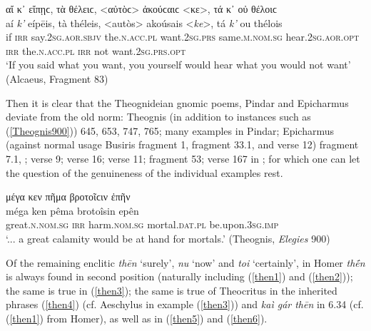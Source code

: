 \begin{exe}
\ex αἴ κ᾽ εἴπῃϲ, τὰ θέλειϲ, \textless{}αὐτὸϲ\textgreater{} ἀκούϲαιϲ \textless{}κε\textgreater{}, τά κ᾽ οὐ θέλοιϲ\\
\gll aí \emph{k'} eípēis, tà théleis, \textless{}autòs\textgreater{} akoúsais \textless{}\emph{ke}\textgreater{}, tá \emph{k'} ou thélois\\
if \textsc{irr} say.\textsc{2sg.aor.sbjv} the.\textsc{n.acc.pl} want.\textsc{2sg.prs} same.\textsc{m.nom.sg} hear.\textsc{2sg.aor.opt} \textsc{irr} the.\textsc{n.acc.pl} \textsc{irr} not want.\textsc{2sg.prs.opt}\\
\trans `If you said what you want, you yourself would hear what you would not want' (Alcaeus, Fragment 83)
\label{Alcaeus83}
\end{exe}

Then it is clear that the Theognideian gnomic poems, Pindar and Epicharmus deviate from the old norm: Theognis (in addition to instances such as (\ref{Theognis900})) 645, 653, 747, 765; many examples in Pindar; Epicharmus (against normal usage \citealp[223]{Lorenz1864} Busiris fragment 1, \citeyearpar[264]{Lorenz1864} fragment 33.1, and \citeyearpar[267]{Lorenz1864} verse 12) fragment 7.1, \citet[257]{Lorenz1864}; \citeyearpar[267]{Lorenz1864} verse 9; \citeyearpar[268]{Lorenz1864} verse 16; \citeyearpar[269]{Lorenz1864} verse 11; \citeyearpar[274]{Lorenz1864} fragment 53; verse 167 in \citet[141]{Mullach1860}; for which one can let the question of the genuineness of the individual examples rest.

\begin{exe}
\ex μέγα κεν πῆμα βροτοῖϲιν ἐπῆν\\
\gll méga ken pêma brotoîsin epên\\
great.\textsc{n.nom.sg} \textsc{irr} harm.\textsc{nom.sg} mortal.\textsc{dat.pl} be.upon.\textsc{3sg.imp}\\
\trans `... a great calamity would be at hand for mortals.' (Theognis, \textit{Elegies} 900)
\label{Theognis900}
\end{exe}

Of the remaining enclitic  \textit{thēn} `surely', \textit{nu} `now' and \textit{toi} `certainly', in Homer \textit{thḗn} is always found in second position (naturally including (\ref{then1}) and (\ref{then2})); the same is true in (\ref{then3}); the same is true of Theocritus in the inherited phrases (\ref{then4}) (cf. Aeschylus in example (\ref{then3})) and \textit{kaì gár thēn} in 6.34 (cf. (\ref{then1}) from Homer), as well as in (\ref{then5}) and (\ref{then6}).

